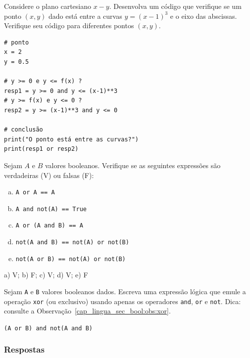 \begin{exer}
  Considere o plano cartesiano $x-y$. Desenvolva um código que verifique se um ponto $(x, y)$ dado está entre a curvas $y = (x-1)^3$ e o eixo das abscissas. Verifique seu código para diferentes pontos $(x, y)$.
\end{exer}
\begin{resp}

\begin{lstlisting}
# ponto
x = 2
y = 0.5

# y >= 0 e y <= f(x) ?
resp1 = y >= 0 and y <= (x-1)**3
# y >= f(x) e y <= 0 ?
resp2 = y >= (x-1)**3 and y <= 0

# conclusão
print("O ponto está entre as curvas?")
print(resp1 or resp2)
\end{lstlisting}

\end{resp}

\begin{exer}
  Sejam $A$ e $B$ valores booleanos. Verifique se as seguintes expressões são verdadeiras (V) ou falsas (F):
  \begin{enumerate}[a)]
  \item \lstinline+A or A == A+
  \item \lstinline+A and not(A) == True+
  \item \lstinline+A or (A and B) == A+
  \item \lstinline+not(A and B) == not(A) or not(B)+
  \item \lstinline+not(A or B) == not(A) or not(B)+
  \end{enumerate}
\end{exer}
\begin{resp}
  a) V; b) F; c) V; d) V; e) F
\end{resp}

\begin{exer}\label{cap_lingua_sec_bool:exer:xor}
  Sejam \lstinline+A+ e \lstinline+B+ valores booleanos dados. Escreva uma expressão lógica que emule a operação \lstinline+xor+ (ou exclusivo) usando apenas os operadores \lstinline+and+, \lstinline+or+ e \lstinline+not+. Dica: consulte a Observação~\ref{cap_lingua_sec_bool:obs:xor}.
\end{exer}
\begin{resp}
  \lstinline+(A or B) and not(A and B)+
\end{resp}

\ifisbook
\subsubsection{Respostas}
\shipoutAnswer
\fi


